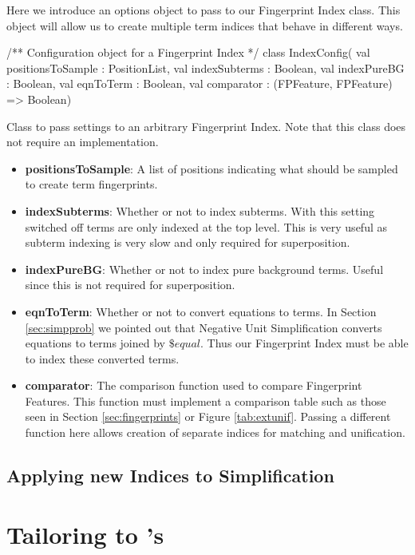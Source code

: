 Here we introduce an options object to pass to our Fingerprint Index class.
This object will allow us to create multiple term indices that behave in different
ways.

\begin{listing}[H]
\begin{scalacode}
/** Configuration object for a Fingerprint Index */
class IndexConfig(
  val positionsToSample : PositionList,
  val indexSubterms     : Boolean,
  val indexPureBG       : Boolean,
  val eqnToTerm         : Boolean,
  val comparator        : (FPFeature, FPFeature) => Boolean)
\end{scalacode}
\caption{Class to pass settings to an arbitrary Fingerprint Index. Note that
this class does not require an implementation.}
\label{lst:config}
\end{listing}

\begin{itemize}
\item \textbf{positionsToSample}: A list of positions indicating what should be sampled
to create term fingerprints.
\item \textbf{indexSubterms}: Whether or not to index subterms. With this setting switched
off terms are only indexed at the top level. This is very useful as subterm indexing
is very slow and only required for superposition.
\item \textbf{indexPureBG}: Whether or not to index pure background terms. Useful
since this is not required for superposition.
\item \textbf{eqnToTerm}: Whether or not to convert equations to terms. In Section
\ref{sec:simpprob} we pointed out that Negative Unit Simplification
converts equations to terms joined by $\$equal$. Thus our Fingerprint Index
must be able to index these converted terms.
\item \textbf{comparator}: The comparison function used to compare Fingerprint Features.
This function must implement a comparison table such as those seen in Section 
\ref{sec:fingerprints} or Figure \ref{tab:extunif}. Passing a different
function here allows creation of separate indices for matching and unification.
\end{itemize}


\subsection{Applying new Indices to Simplification}


\section{Tailoring to \Beagle's \HSWAC}
\label{sec:tailored}

